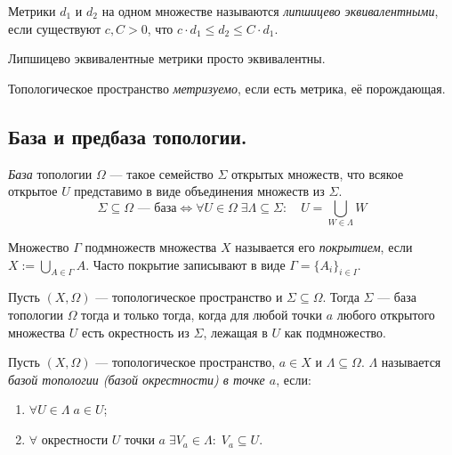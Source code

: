 \documentclass[12pt,a4paper]{article}
\begin{document}
    \begin{definition}
        Метрики $d_1$ и $d_2$ на одном множестве называются \emph{липшицево эквивалентными}, если существуют $c, C > 0$, что $c \cdot d_1 \leqslant d_2 \leqslant C \cdot d_1$.
    \end{definition}

    \begin{theorem}
        Липшицево эквивалентные метрики просто эквивалентны.
    \end{theorem}

    \begin{definition}
        Топологическое пространство \emph{метризуемо}, если есть метрика, её порождающая.
    \end{definition}

    \subsection{База и предбаза топологии.}

    \begin{definition}
        \emph{База} топологии $\Omega$ --- такое семейство $\Sigma$ открытых множеств, что всякое открытое $U$ представимо в виде объединения множеств из $\Sigma$.
        \[\Sigma \subseteq \Omega\text{ --- база} \Longleftrightarrow \forall U \in \Omega\; \exists \Lambda \subseteq \Sigma:\quad U = \bigcup_{W \in \Lambda} W\]
    \end{definition}

    \begin{definition}
        Множество $\Gamma$ подмножеств множества $X$ называется его \emph{покрытием}, если $X := \bigcup_{A \in \Gamma} A$. Часто покрытие записывают в виде $\Gamma = \{A_i\}_{i \in I}$.
    \end{definition}

    \begin{theorem}
        Пусть $(X, \Omega)$ --- топологическое пространство и $\Sigma \subseteq \Omega$. Тогда $\Sigma$ --- база топологии $\Omega$ тогда и только тогда, когда для любой точки $a$ любого открытого множества $U$ есть окрестность из $\Sigma$, лежащая в $U$ как подмножество.
    \end{theorem}

    \begin{definition}
        Пусть $(X, \Omega)$ --- топологическое пространство, $a \in X$ и $\Lambda \subseteq \Omega$. $\Lambda$ называется \emph{базой топологии (базой окрестности) в точке $a$}, если:
        \begin{enumerate}
            \item $\forall U \in \Lambda\; a \in U$;
            \item $\forall\text{ окрестности }U\text{ точки }a\; \exists V_a \in \Lambda:\; V_a \subseteq U$.
        \end{enumerate}
    \end{definition}
\end{document}
